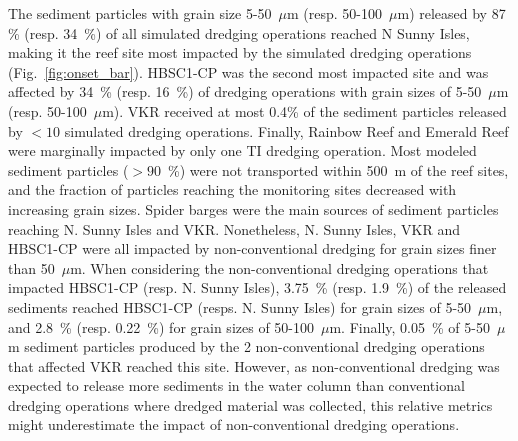 \documentclass[preprint,12pt,authoryear]{elsarticle}
\begin{document}
The sediment particles with grain size 5-50~$\mu$m (resp. 50-100~$\mu$m) released by 87 \% (resp. 34~\%) of all simulated dredging operations reached N Sunny Isles, making it the reef site most impacted by the simulated dredging operations (Fig.~\ref{fig:onset_bar}). HBSC1-CP was the second most impacted site and was affected by 34~\% (resp. 16~\%) of dredging operations with grain sizes of 5-50~$\mu$m (resp. 50-100~$\mu$m). VKR received at most 0.4\% of the sediment particles released by $<10$ simulated dredging operations. Finally, Rainbow Reef and Emerald Reef were marginally impacted by only one TI dredging operation. Most modeled sediment particles ($>90$~\%) were not transported within 500~m of the reef sites, and the fraction of particles reaching the monitoring sites decreased with increasing grain sizes. Spider barges were the main sources of sediment particles reaching N. Sunny Isles and VKR. Nonetheless, N. Sunny Isles, VKR and HBSC1-CP were all impacted by non-conventional dredging for grain sizes finer than 50~$\mu$m. When considering the non-conventional dredging operations that impacted HBSC1-CP (resp. N. Sunny Isles), 3.75~\% (resp. 1.9~\%) of the released sediments reached HBSC1-CP (resps. N. Sunny Isles) for grain sizes of 5-50~$\mu$m, and 2.8~\% (resp. 0.22~\%) for grain sizes of 50-100~$\mu$m. Finally, 0.05~\% of 5-50~$\mu$m sediment particles produced by the 2 non-conventional dredging operations that affected VKR reached this site. However, as non-conventional dredging was expected to release more sediments in the water column than conventional dredging operations where dredged material was collected, this relative metrics might underestimate the impact of non-conventional dredging operations.
\end{document}

